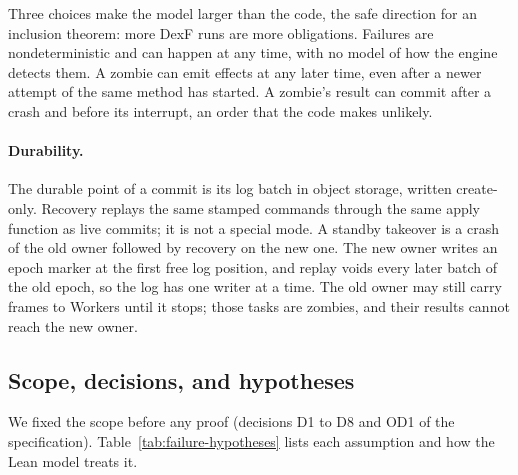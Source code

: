 Three choices make the model larger than the code, the safe direction
for an inclusion theorem: more DexF runs are more obligations. Failures
are nondeterministic and can happen at any time, with no model of how the
engine detects them. A zombie can emit effects at any later time, even
after a newer attempt of the same method has started. A zombie's result
can commit after a crash and before its interrupt, an order that the code
makes unlikely.

\paragraph{Durability.}
The durable point of a commit is its log batch in object storage, written
create-only. Recovery replays the same stamped commands through the same
apply function as live commits; it is not a special mode. A standby
takeover is a crash of the old owner followed by recovery on the new one.
The new owner writes an epoch marker at the first free log position, and
replay voids every later batch of the old epoch, so the log has one writer
at a time. The old owner may still carry frames to Workers until it stops;
those tasks are zombies, and their results cannot reach the new owner.

\subsection{Scope, decisions, and hypotheses}
\label{sec:failure-scope}

We fixed the scope before any proof (decisions D1 to D8 and OD1 of the
specification). Table~\ref{tab:failure-hypotheses} lists each assumption
and how the Lean model treats it.

